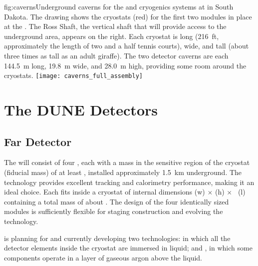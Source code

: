 \begin{dunefigure}{fig:caverns}{Underground caverns for the   and cryogenics systems at  in South Dakota. The drawing shows the cryostats (red) for the first two  modules  in place at the . The Ross Shaft, the vertical shaft that will provide access to the  underground area, appears on the right. 
Each cryostat is \cryostatlen long (\SI{216}{ft}, approximately the length of two and a half tennis courts), \cryostatwdth wide, and \cryostatht tall (about three times as tall as an adult giraffe).
The two detector caverns are each 
\SI{144.5}{\meter} long, \SI{19.8}{\meter} wide,  and \SI{28.0}{\meter} high, providing some room around the cryostats.}
\texttt{[image: caverns\_full\_assembly]}
\end{dunefigure}




\section{The DUNE Detectors}




\subsection{Far Detector}
\label{ch:dune-det-tech-ov-fd}

The \fdfiducialmass {}  will consist of four  , each with a  mass in the sensitive region of the cryostat (fiducial mass) of at least \nominalmodsize, installed approximately \SI{1.5}{km} underground. The  technology provides
excellent tracking and calorimetry performance, making it an ideal 
choice. Each  fits inside a cryostat of internal dimensions
\cryostatwdthinner (w) $\times$ \cryostathtinner (h) $\times$ \cryostatleninner~(l) containing a total  mass of about \larmass{}.
 The design of the four identically sized modules is sufficiently flexible for staging construction and evolving the  technology.

 is planning for and currently developing two  technologies:  in which all the detector elements inside the cryostat are immersed in liquid; and , in which some components operate in a layer of gaseous argon above the liquid.

